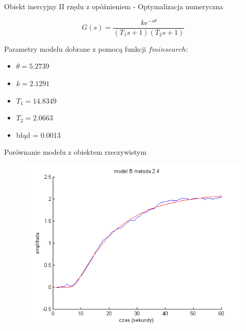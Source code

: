 \documentclass{beamer}
\begin{document}
\begin{frame}{Obiekt inercyjny II rzędu z opóźnieniem - Optymalizacja numeryczna }

\begin{equation*}
G(s) = \frac{k e^{-s \theta}}{(T_1 s + 1)(T_2 s + 1)}
\end{equation*}

Parametry modelu dobrane z pomocą funkcji $fminsearch$:

\begin{itemize}
\item $\theta =  5.2739$
\item $k =  2.1291$
\item $T_1 = 14.8349$
\item $T_2 = 2.0663 $
\item błąd =  0.0013
\end{itemize}

\end{frame}


\begin{frame}{Porównanie modelu z obiektem rzeczywistym}

\begin{figure}
\includegraphics[width = \linewidth]{B_2_4}
\end{figure}

\end{frame}
\end{document}
